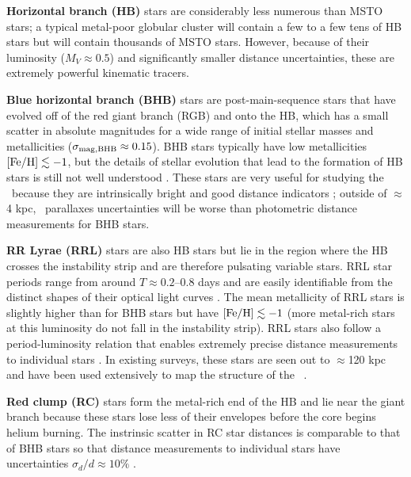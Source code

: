 {\bf Horizontal branch (HB)} stars are considerably less numerous than MSTO
stars; a typical metal-poor globular cluster will contain a few to a few tens of
HB stars but will contain thousands of MSTO stars. However, because of their
luminosity ($M_V \approx 0.5$) and significantly smaller distance uncertainties,
these are extremely powerful kinematic tracers.

{\bf Blue horizontal branch (BHB)} stars are post-main-sequence stars that have
evolved off of the red giant branch (RGB) and onto the HB, which has a small
scatter in absolute magnitudes for a wide range of initial stellar masses and
metallicities ($\sigma_{\rm mag,BHB} \approx 0.15$). BHB stars typically have
low metallicities ${[{\rm Fe}/{\rm H}]} \lesssim -1$, but the details of stellar evolution that
lead to the formation of HB stars is still not well understood
\citep{percival11}. These stars are very useful for studying the \mwhalo\ because
they are intrinsically bright and good distance indicators \cite[$\sigma_{d}/d
\approx 10\%$; see, e.g.,][]{xue08, deason11}; outside of $\approx$4 kpc, \gaia\
parallaxes uncertainties will be worse than photometric distance measurements
for BHB stars.

{\bf RR Lyrae (RRL)} stars are also HB stars but lie in the region where the HB
crosses the instability strip and are therefore pulsating variable stars. RRL
star periods range from around $T \approx 0.2$--$0.8$ days and are easily
identifiable from the distinct shapes of their optical light curves
\citep[e.g.,][]{sesar10}. The mean metallicity of RRL stars is slightly higher
than for BHB stars but have ${[{\rm Fe}/{\rm H}]} \lesssim -1$ (more metal-rich stars at this
luminosity do not fall in the instability strip). RRL stars also follow a
period-luminosity relation \citep[tightest in the mid-infrared;][]{madore12}
that enables extremely precise distance measurements to individual stars
\citep[$\approx$1--2\%;][]{klein14}. In existing surveys, these stars are seen
out to $\approx$120 kpc \citep{sesar10} and have been used extensively to map
the structure of the \mwhalo\ \citep[e.g.,][]{sesar13a}.

{\bf Red clump (RC)} stars form the metal-rich end of the HB and lie near the
giant branch because these stars lose less of their envelopes before the core
begins helium burning. The instrinsic scatter in RC star distances is comparable
to that of BHB stars so that distance measurements to individual stars have
uncertainties $\sigma_{d}/d \approx 10\%$ \citep[e.g.,][]{bovy14-rc}.

